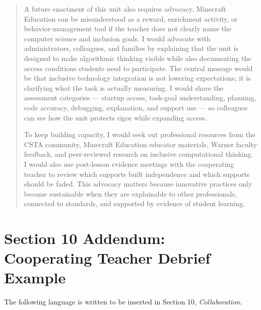 \documentclass[12pt]{article}
\begin{document}
\begin{quote}
A future enactment of this unit also requires advocacy. Minecraft Education can be misunderstood as a reward, enrichment activity, or behavior-management tool if the teacher does not clearly name the computer science and inclusion goals. I would advocate with administrators, colleagues, and families by explaining that the unit is designed to make algorithmic thinking visible while also documenting the access conditions students need to participate. The central message would be that inclusive technology integration is not lowering expectations; it is clarifying what the task is actually measuring. I would share the assessment categories --- startup access, task-goal understanding, planning, code accuracy, debugging, explanation, and support use --- so colleagues can see how the unit protects rigor while expanding access.

To keep building capacity, I would seek out professional resources from the CSTA community, Minecraft Education educator materials, Warner faculty feedback, and peer-reviewed research on inclusive computational thinking. I would also use post-lesson evidence meetings with the cooperating teacher to review which supports built independence and which supports should be faded. This advocacy matters because innovative practices only become sustainable when they are explainable to other professionals, connected to standards, and supported by evidence of student learning.
\end{quote}

\section{Section 10 Addendum: Cooperating Teacher Debrief Example}

The following language is written to be inserted in Section 10, \emph{Collaboration}.
\end{document}
